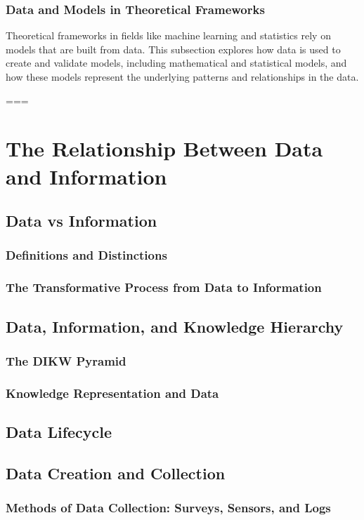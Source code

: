 \documentclass[12pt, oneside]{book}
\begin{document}
\subsubsection{Data and Models in Theoretical Frameworks}
Theoretical frameworks in fields like machine learning and statistics rely on models that are built from data. This subsection explores how data is used to create and validate models, including mathematical and statistical models, and how these models represent the underlying patterns and relationships in the data.

===

\section{The Relationship Between Data and Information}
\subsection{Data vs Information}
\subsubsection{Definitions and Distinctions}
\subsubsection{The Transformative Process from Data to Information}
\subsection{Data, Information, and Knowledge Hierarchy}
\subsubsection{The DIKW Pyramid}
\subsubsection{Knowledge Representation and Data}
\subsection{Data Lifecycle}
\subsection{Data Creation and Collection}
\subsubsection{Methods of Data Collection: Surveys, Sensors, and Logs}
\end{document}
